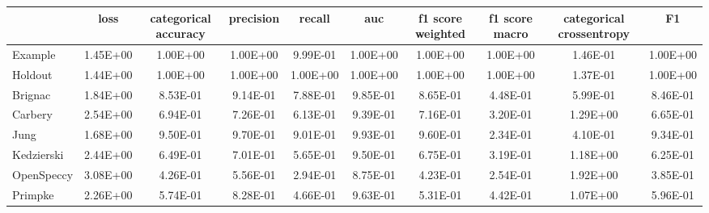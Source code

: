 \begin{tabular}{lccccccccc}
\toprule
 & loss & categorical accuracy & precision & recall & auc & f1 score weighted & f1 score macro & categorical crossentropy & F1 \\
\midrule
Example & 1.45E+00 & 1.00E+00 & 1.00E+00 & 9.99E-01 & 1.00E+00 & 1.00E+00 & 1.00E+00 & 1.46E-01 & 1.00E+00 \\
Holdout & 1.44E+00 & 1.00E+00 & 1.00E+00 & 1.00E+00 & 1.00E+00 & 1.00E+00 & 1.00E+00 & 1.37E-01 & 1.00E+00 \\
Brignac & 1.84E+00 & 8.53E-01 & 9.14E-01 & 7.88E-01 & 9.85E-01 & 8.65E-01 & 4.48E-01 & 5.99E-01 & 8.46E-01 \\
Carbery & 2.54E+00 & 6.94E-01 & 7.26E-01 & 6.13E-01 & 9.39E-01 & 7.16E-01 & 3.20E-01 & 1.29E+00 & 6.65E-01 \\
Jung & 1.68E+00 & 9.50E-01 & 9.70E-01 & 9.01E-01 & 9.93E-01 & 9.60E-01 & 2.34E-01 & 4.10E-01 & 9.34E-01 \\
Kedzierski & 2.44E+00 & 6.49E-01 & 7.01E-01 & 5.65E-01 & 9.50E-01 & 6.75E-01 & 3.19E-01 & 1.18E+00 & 6.25E-01 \\
OpenSpeccy & 3.08E+00 & 4.26E-01 & 5.56E-01 & 2.94E-01 & 8.75E-01 & 4.23E-01 & 2.54E-01 & 1.92E+00 & 3.85E-01 \\
Primpke & 2.26E+00 & 5.74E-01 & 8.28E-01 & 4.66E-01 & 9.63E-01 & 5.31E-01 & 4.42E-01 & 1.07E+00 & 5.96E-01 \\
\bottomrule
\end{tabular}
